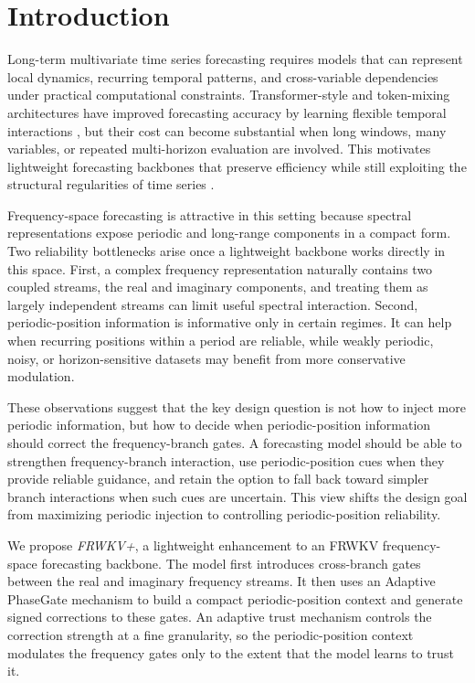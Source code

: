 \documentclass[a4paper,fleqn]{cas-sc}
\begin{document}
\maketitle

\section{Introduction}
Long-term multivariate time series forecasting requires models that can represent local dynamics, recurring temporal patterns, and cross-variable dependencies under practical computational constraints. Transformer-style and token-mixing architectures have improved forecasting accuracy by learning flexible temporal interactions \cite{nie2023patchtst,wu2023timesnet,wang2024timemixer,liu2024itransformer}, but their cost can become substantial when long windows, many variables, or repeated multi-horizon evaluation are involved. This motivates lightweight forecasting backbones that preserve efficiency while still exploiting the structural regularities of time series \cite{zeng2023dlinear}.

Frequency-space forecasting is attractive in this setting because spectral representations expose periodic and long-range components in a compact form. Two reliability bottlenecks arise once a lightweight backbone works directly in this space. First, a complex frequency representation naturally contains two coupled streams, the real and imaginary components, and treating them as largely independent streams can limit useful spectral interaction. Second, periodic-position information is informative only in certain regimes. It can help when recurring positions within a period are reliable, while weakly periodic, noisy, or horizon-sensitive datasets may benefit from more conservative modulation.

These observations suggest that the key design question is not how to inject more periodic information, but how to decide when periodic-position information should correct the frequency-branch gates. A forecasting model should be able to strengthen frequency-branch interaction, use periodic-position cues when they provide reliable guidance, and retain the option to fall back toward simpler branch interactions when such cues are uncertain. This view shifts the design goal from maximizing periodic injection to controlling periodic-position reliability.

We propose \textit{FRWKV+}, a lightweight enhancement to an FRWKV frequency-space forecasting backbone. The model first introduces cross-branch gates between the real and imaginary frequency streams. It then uses an Adaptive PhaseGate mechanism to build a compact periodic-position context and generate signed corrections to these gates. An adaptive trust mechanism controls the correction strength at a fine granularity, so the periodic-position context modulates the frequency gates only to the extent that the model learns to trust it.
\end{document}
